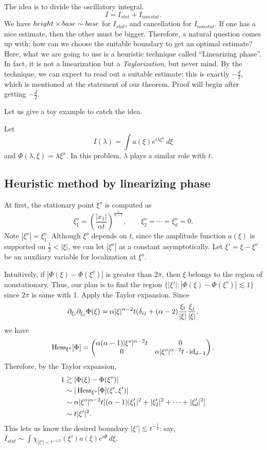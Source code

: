 \documentclass{../exp}
\begin{document}
The idea is to divide the oscillatory integral.
\[I=I_{stat}+I_{nonstat}.\]
We have $height\times base\sim base$ for $I_{stat}$, and cancellation for $I_{nonstat}$.
If one has a nice estimate, then the other must be bigger.
Therefore, a natural question comes up with: how can we choose the suitable boundary to get an optimal estimate?
Here, what we are going to use is a heuristic technique called ``Linearizing phase''.
In fact, it is not a linearization but a \emph{Taylorization}, but never mind.
By the technique, we can expect to read out a suitable estimate: this is exactly $-\frac d2$, which is mentioned at the statement of our theorem.
Proof will begin after getting $-\frac d2$.

Let us give a toy example to catch the idea.
\begin{ex}
Let
\[I(\lambda)=\int a(\xi)e^{i\lambda\xi^n}\,d\xi\]
and $\Phi(\lambda,\xi)=\lambda\xi^n$.
In this problem, $\lambda$ plays a similar role with $t$.

\end{ex}

\subsection{Heuristic method by linearizing phase}
At first, the stationary point $\xi^o$ is computed as
\[\xi_1^o=\left(\frac{|x_1|}{\alpha t}\right)^{\frac1{\alpha-1}},\qquad\xi_2^o=\cdots=\xi_d^o=0.\]
Note $|\xi^o|=\xi_1^o$.
Although $\xi^o$ depends on $t$, since the amplitude function $a(\xi)$ is supported on $\frac12<|\xi|$, we can let $|\xi^o|$ as a constant asymptotically.
Let $\xi'=\xi-\xi^o$ be an auxiliary variable for localization at $\xi^o$.

Intuitively, if $|\Phi(\xi)-\Phi(\xi^o)|$ is greater than $2\pi$, then $\xi$ belongs to the region of nonstationary.
Thus, our plan is to find the region $\{|\xi'|:|\Phi(\xi)-\Phi(\xi^o)|\lesssim1\}$ since $2\pi$ is same with 1.
Apply the Taylor expansion.
Since
\[\pd_{\xi_i}\pd_{\xi_j}\Phi(\xi)=\alpha|\xi|^{\alpha-2}t(\delta_{ij}+(\alpha-2)\frac{\xi_i}{|\xi|}\frac{\xi_j}{|\xi|},\]
we have
\[\operatorname{Hess}_{\xi^o}[\Phi]=\begin{pmatrix}\alpha(\alpha-1)|\xi^o|^{\alpha-2}t&0\\0&\alpha|\xi^o|^{\alpha-2}t\cdot\operatorname{id}_{d-1}\end{pmatrix}.\]
Therefore, by the Taylor expansion,
\begin{align*}
1&\gtrsim|\Phi(\xi)-\Phi(\xi^o)|\\
&\sim|\operatorname{Hess}_{\xi^o}[\Phi](\xi',\xi')|\\
&\sim\alpha|\xi^o|^{\alpha-2}t[(\alpha-1)|\xi'_1|^2+|\xi'_2|^2+\cdots+|\xi'_d|^2]\\
&\sim t|\xi'|^2.
\end{align*}
This lets us know the desired boundary $|\xi'|\lesssim t^{-\frac12}$: say, $I_{stat}\sim\int\chi_{|\xi'|<t^{-1/2}}(\xi')a(\xi)e^{i\Phi}\,d\xi$.
\end{document}
